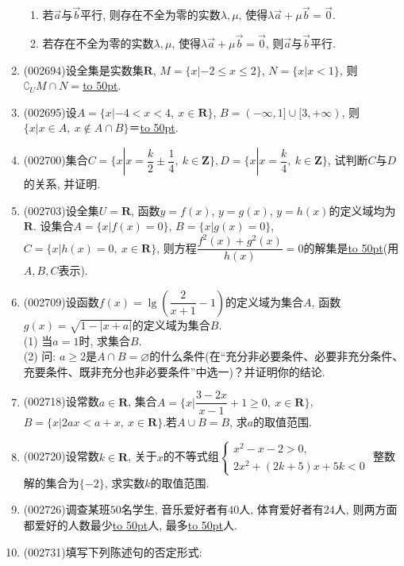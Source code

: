 \documentclass[10pt,a4paper]{article}
\newcommand{\blank}[1]{\underline{\hbox to #1pt{}}}
\begin{document}
\begin{enumerate}[1.]
\begin{enumerate}[\blank{30}(1)]
\item 若$\overrightarrow{a}$与$\overrightarrow{b}$平行, 则存在不全为零的实数$\lambda,\mu$, 使得$\lambda\overrightarrow{a}+\mu\overrightarrow{b}=\overrightarrow{0}$.\\ 
\item 若存在不全为零的实数$\lambda,\mu$, 使得$\lambda\overrightarrow{a}+\mu\overrightarrow{b}=\overrightarrow{0}$, 则$\overrightarrow{a}$与$\overrightarrow{b}$平行.\\ 
\end{enumerate}
\item {\tiny (002694)}设全集是实数集$\mathbf{R}$, $M=\{x|-2 \le x\le 2\}$, $N=\{x|x<1\}$, 则$\complement_U M\cap N=$\blank{50}.
\item {\tiny (002695)}设$A=\{x|-4<x<4, \ x\in \mathbf{R}\}$, $B=(-\infty,1]\cup [3,+\infty)$, 则$\{x|x\in A, \ x\notin A\cap B  \}$＝\blank{50}.
\item {\tiny (002700)}集合$C=\{x|x=\dfrac k2\pm \dfrac14, \ k\in \mathbf{Z}\},D=\{x|x=\dfrac k4,\ k\in \mathbf{Z}\}$, 试判断$C$与$D$的关系, 并证明.
\vspace*{24ex}
\item {\tiny (002703)}设全集$U=\mathbf{R}$, 函数$y=f(x)$, $y=g(x)$, $y=h(x)$的定义域均为$\mathbf{R}$. 设集合$A=\{x|f(x)=0\}$, $B=\{x|g(x)=0\}$, $C=\{x|h(x)=0, \ x\in \mathbf{R}\}$, 则方程$\dfrac{f^2(x)+g^2(x)}{h(x)}=0$的解集是\blank{50}(用$A,B,C$表示).
\item {\tiny (002709)}设函数$f(x)=\lg (\dfrac2{x+1}-1)$的定义域为集合$A$, 函数$g(x)=\sqrt{1-|x+a|}$的定义域为集合$B$.\\
(1) 当$a=1$时, 求集合$B$.\\
(2) 问: $a\ge 2$是$A\cap B=\varnothing$的什么条件(在``充分非必要条件、必要非充分条件、充要条件、既非充分也非必要条件''中选一)？并证明你的结论.
\item {\tiny (002718)}设常数$a\in \mathbf{R}$, 集合$A=\{x|\dfrac{3-2x}{x-1}+1 \ge 0, \ x\in \mathbf{R}\}$, $B=\{x|2ax<a+x, \ x\in \mathbf{R} \}$.若$A\cup B=B$, 求$a$的取值范围.
\item {\tiny (002720)}设常数$k\in \mathbf{R}$, 关于$x$的不等式组$\begin{cases} x^2-x-2>0, \\ 2x^2+(2k+5)x+5k<0 \end{cases}$ 整数解的集合为$\{-2\}$, 求实数$k$的取值范围.
\item {\tiny (002726)}调查某班$50$名学生, 音乐爱好者有$40$人, 体育爱好者有$24$人, 则两方面都爱好的人数最少\blank{50}人, 最多\blank{50}人.
\item {\tiny (002731)}填写下列陈述句的否定形式:\\

\end{enumerate}
\end{document}
